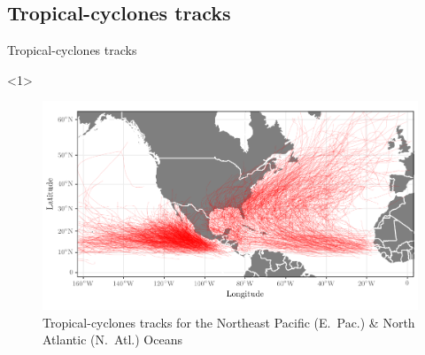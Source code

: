 \subsection{Tropical-cyclones tracks}
\begin{frame}{Tropical-cyclones tracks}

\begin{onlyenv}<1>
\begin{figure}[H]
	\centering
	\includegraphics[scale=0.6]{images/complete-map}
	\caption{Tropical-cyclones tracks for the Northeast Pacific (E.~Pac.) \& North Atlantic (N.~Atl.) Oceans}
	\label{fig:figure1}
\end{figure}
\end{onlyenv}


\end{frame}
